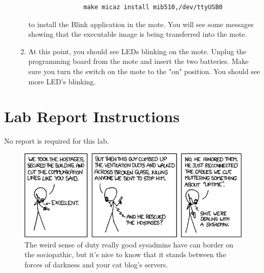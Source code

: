 \documentclass[letterpaper,12pt]{article}
\begin{document}
\begin{enumerate}
\begin{enumerate}
               \begin{lstlisting}
               make micaz install mib510,/dev/ttyUSB0
               \end{lstlisting}
               to install the Blink application in the mote. You will see some messages showing that the executable image
               is being transferred into the mote.
         \item At this point, you should see LEDs blinking on the mote. Unplug the programming board
               from the mote and insert the two batteries. Make sure you turn the switch on the mote to the
               "on" position. You should see more LED's blinking.
      \end{enumerate}
\end{enumerate}

\section*{Lab Report Instructions}
No report is required for this lab.

\begin{figure}[ht!]
	\centering
	\includegraphics[width=5in]{devotion_to_duty.png}
	\caption*{The weird sense of duty really good sysadmins have can border on the sociopathic, 
		but it's nice to know that it stands between the forces of darkness and your cat blog's servers.}
\end{figure}
\end{document}
